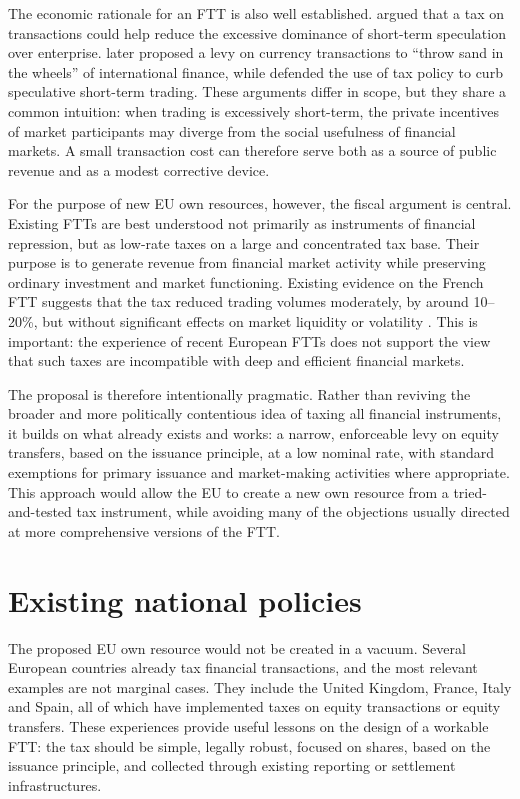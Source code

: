 \documentclass[../../main]{subfiles}
\begin{document}
The economic rationale for an FTT is also well established. \citet{Keynes1936} argued that a tax on transactions could help reduce the excessive dominance of short-term speculation over enterprise. \citet{Tobin1978} later proposed a levy on currency transactions to ``throw sand in the wheels'' of international finance, while \citet{Stiglitz1989} defended the use of tax policy to curb speculative short-term trading. These arguments differ in scope, but they share a common intuition: when trading is excessively short-term, the private incentives of market participants may diverge from the social usefulness of financial markets. A small transaction cost can therefore serve both as a source of public revenue and as a modest corrective device.

For the purpose of new EU own resources, however, the fiscal argument is central. Existing FTTs are best understood not primarily as instruments of financial repression, but as low-rate taxes on a large and concentrated tax base. Their purpose is to generate revenue from financial market activity while preserving ordinary investment and market functioning. Existing evidence on the French FTT suggests that the tax reduced trading volumes moderately, by around 10--20\%, but without significant effects on market liquidity or volatility \citep{ColliardHoffmann2017}. This is important: the experience of recent European FTTs does not support the view that such taxes are incompatible with deep and efficient financial markets.

The proposal is therefore intentionally pragmatic. Rather than reviving the broader and more politically contentious idea of taxing all financial instruments, it builds on what already exists and works: a narrow, enforceable levy on equity transfers, based on the issuance principle, at a low nominal rate, with standard exemptions for primary issuance and market-making activities where appropriate. This approach would allow the EU to create a new own resource from a tried-and-tested tax instrument, while avoiding many of the objections usually directed at more comprehensive versions of the FTT.

\section{Existing national policies}

The proposed EU own resource would not be created in a vacuum. Several European countries already tax financial transactions, and the most relevant examples are not marginal cases. They include the United Kingdom, France, Italy and Spain, all of which have implemented taxes on equity transactions or equity transfers. These experiences provide useful lessons on the design of a workable FTT: the tax should be simple, legally robust, focused on shares, based on the issuance principle, and collected through existing reporting or settlement infrastructures.
\end{document}
